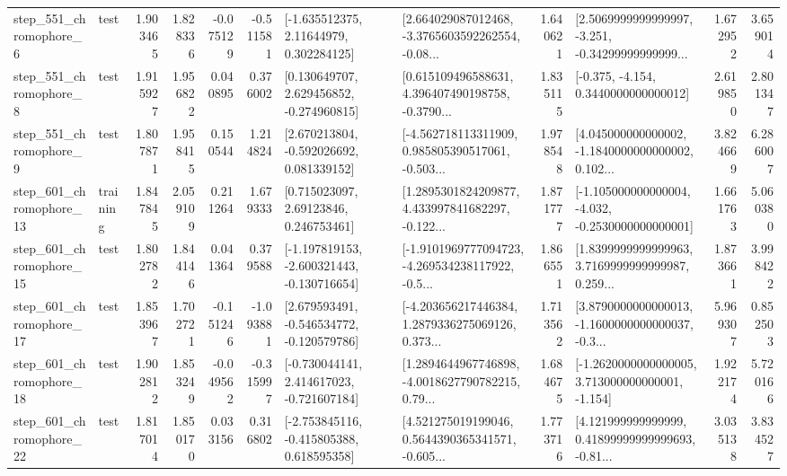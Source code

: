\begin{tabular}{llrrrrllrlrr}
   step\_551\_chromophore\_6 &      test &      1.903465 &    1.828336 &     -0.075129 & -0.511581 &     [-1.635512375, 2.11644979, 0.302284125] &  [2.664029087012468, -3.3765603592262554, -0.08... &       1.640621 &  [2.5069999999999997, -3.251, -0.34299999999999... &            1.672952 &          3.659014 \\
   step\_551\_chromophore\_8 &      test &      1.915927 &    1.956822 &      0.040895 &  0.376002 &    [0.130649707, 2.629456852, -0.274960815] &  [0.615109496588631, 4.396407490198758, -0.3790... &       1.835115 &               [-0.375, -4.154, 0.3440000000000012] &            2.619850 &          2.801347 \\
   step\_551\_chromophore\_9 &      test &      1.807871 &    1.958415 &      0.150544 &  1.214824 &    [2.670213804, -0.592026692, 0.081339152] &  [-4.562718113311909, 0.985805390517061, -0.503... &       1.978548 &  [4.045000000000002, -1.1840000000000002, 0.102... &            3.824669 &          6.286007 \\
  step\_601\_chromophore\_13 &  training &      1.847845 &    2.059109 &      0.211264 &  1.679333 &      [0.715023097, 2.69123846, 0.246753461] &  [1.2895301824209877, 4.433997841682297, -0.122... &       1.871777 &  [-1.105000000000004, -4.032, -0.2530000000000001] &            1.661763 &          5.060380 \\
  step\_601\_chromophore\_15 &      test &      1.802782 &    1.844146 &      0.041364 &  0.379588 &  [-1.197819153, -2.600321443, -0.130716654] &  [-1.9101969777094723, -4.269534238117922, -0.5... &       1.866551 &  [1.8399999999999963, 3.7169999999999987, 0.259... &            1.873661 &          3.998422 \\
  step\_601\_chromophore\_17 &      test &      1.853967 &    1.702721 &     -0.151246 & -1.093881 &   [2.679593491, -0.546534772, -0.120579786] &  [-4.203656217446384, 1.2879336275069126, 0.373... &       1.713562 &  [3.8790000000000013, -1.1600000000000037, -0.3... &            5.969307 &          0.852503 \\
  step\_601\_chromophore\_18 &      test &      1.902812 &    1.853249 &     -0.049562 & -0.315997 &   [-0.730044141, 2.414617023, -0.721607184] &  [1.2894644967746898, -4.0018627790782215, 0.79... &       1.684675 &   [-1.2620000000000005, 3.713000000000001, -1.154] &            1.922174 &          5.720166 \\
  step\_601\_chromophore\_22 &      test &      1.817014 &    1.850170 &      0.033156 &  0.316802 &   [-2.753845116, -0.415805388, 0.618595358] &  [4.521275019199046, 0.5644390365341571, -0.605... &       1.773716 &  [4.121999999999999, 0.41899999999999693, -0.81... &            3.035138 &          3.834527 \\

\end{tabular}
